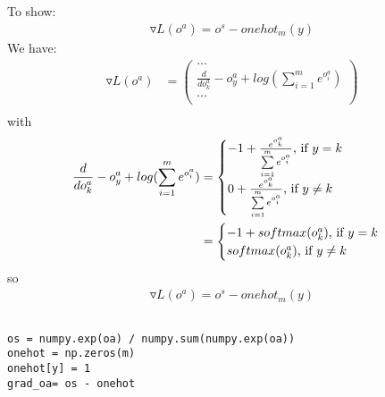 \documentclass[12pt]{article}
\begin{document}
\subsection{}
To show:
\begin{align}
\label{grad_oa}
\triangledown L({o^a}) = o^s-onehot_m(y)
\end{align}
We have: 
\begin{align*}
\triangledown L({o^a}) & = \begin{pmatrix}
... \\
\frac{d}{do^a_k} -o^a_y+log(\sum\limits_{i=1}^m e^{o^a_i}) \\
... \\
\end{pmatrix} \\
\end{align*}
with
\begin{align*}
\frac{d}{do^a_k} -o^a_y+log(\sum\limits_{i=1}^m e^{o^a_i}) & = \begin{cases}
               -1+\frac{e^{o^a_k}}{\sum\limits_{i=1}^m e^{o^a_i}}$, if $ y = k \\
               0+\frac{e^{o^a_k}}{\sum\limits_{i=1}^m e^{o^a_i}}$, if $ y \neq k \\
            \end{cases} \\
            & = \begin{cases}
               -1+ softmax(o^a_k)$, if $ y = k \\
               softmax(o^a_k)$, if $ y \neq k \\
            \end{cases} \\
\end{align*}
so \begin{align*}
\triangledown L({o^a}) = o^s-onehot_m(y)
\end{align*}
\subsection{}
\begin{lstlisting}
os = numpy.exp(oa) / numpy.sum(numpy.exp(oa))
onehot = np.zeros(m)
onehot[y] = 1
grad_oa= os - onehot
\end{lstlisting}
\end{document}
